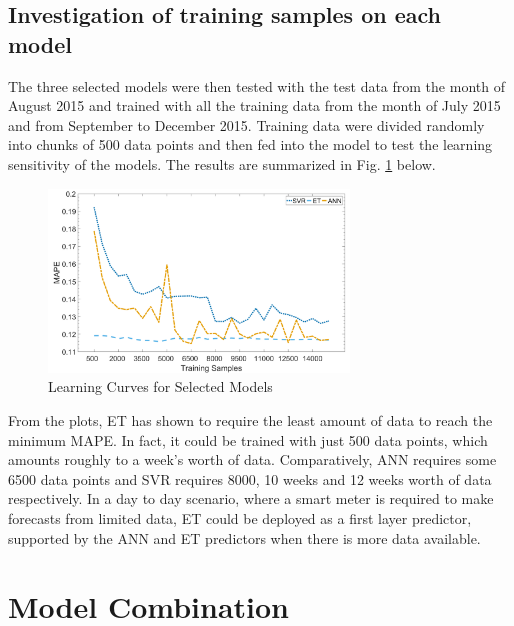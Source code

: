 \documentclass[conference]{IEEEtran}
\begin{document}
\subsection{Investigation of training samples on each model}
The three selected models were then tested with the test data from the month of August 2015 and trained with all the training data from the month of July 2015 and from September to December 2015. Training data were divided randomly into chunks of 500 data points and then fed into the model to test the learning sensitivity of the models. The results are summarized in Fig. \ref{learningpotentialedited} below. 
\begin{figure}[htb!]\centering \footnotesize
\includegraphics[width=80mm]{learningpotentialforecasting}
\caption{Learning Curves for Selected Models}
\vspace{-0.3cm}
\label{learningpotentialedited}
\end{figure}
From the plots, ET has shown to require the least amount of data to reach the minimum MAPE. In fact, it could be trained with just 500 data points, which amounts roughly to a week's worth of data. Comparatively, ANN requires some 6500 data points and SVR requires 8000, 10 weeks and 12 weeks worth of data respectively. In a day to day scenario, where a smart meter is required to make forecasts from limited data, ET could be deployed as a first layer predictor, supported by the ANN and ET predictors when there is more data available.  
						
\section{Model Combination}\label{mcom}
\end{document}
